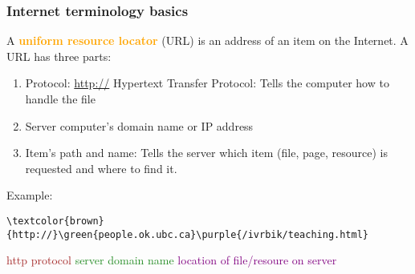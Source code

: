 \documentclass[xcolor=svgnames]{beamer}
\newcommand{\green}[1]{\textcolor{ForestGreen}{#1}}
\newcommand{\purple}[1]{{\textcolor{purple}{#1}}}
\newcommand{\define}[1]{\textbf{\textcolor{orange}{#1}}}
\newcommand{\ft}[1]{\frametitle{#1}}
\begin{document}








\begin{frame}[fragile]\ft{Internet terminology basics}
A \define{uniform resource locator} (URL) is an address of an item on the Internet. A URL has three parts:
\begin{enumerate}
\item Protocol: \url{http://} Hypertext Transfer Protocol: Tells the computer how to handle the file
\item Server computer's domain name or IP address
\item Item's path and name:
Tells the server which item (file, page, resource) is requested and where to find it.
\end{enumerate}
Example:
\begin{Verbatim}[xleftmargin=.5in,commandchars=\\\{\}]
\textcolor{brown}{http://}\green{people.ok.ubc.ca}\purple{/ivrbik/teaching.html}
\end{Verbatim}
 \textcolor{brown}{http protocol} \green{server domain name} \purple{location of file/resoure on server}
\end{frame}
\end{document}
